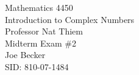 \begin{titlepage}
\setlength{\topmargin}{1.5in}
\begin{center}
\Huge{Mathematics 4450} \\
\LARGE{Introduction to Complex Numbers} \\
\Large{Professor Nat Thiem} \\[1cm]

\huge{Midterm Exam \#2}\\[0.5cm]

\large{Joe Becker} \\
\large{SID: 810-07-1484} \\
\large{\due} 

\end{center}

\end{titlepage}

